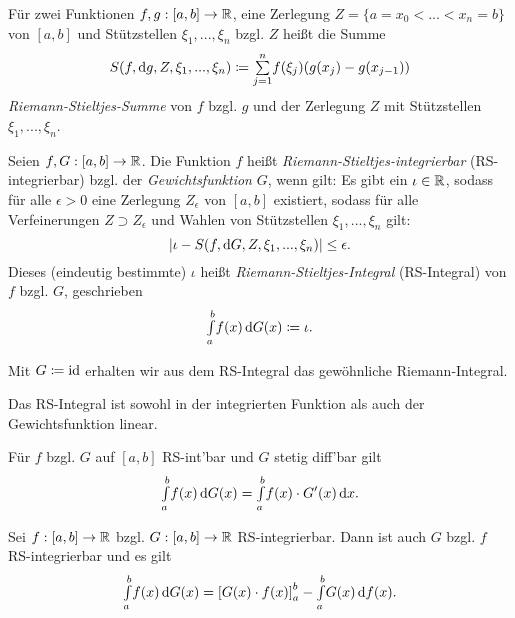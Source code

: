 \documentclass{cheat-sheet}
\begin{document}
\begin{defn}
  Für zwei Funktionen $f, g : [a, b] \to \mathbb{R}$, eine Zerlegung $Z = \{ a = x_0 < ... < x_n = b \}$ von $[a, b]$ und Stützstellen $\xi_1, ..., \xi_n$ bzgl. $Z$ heißt die Summe
  \[ S(f, \d g, Z, \xi_1, ..., \xi_n) \coloneqq \sum_{j=1}^{n}\!f(\xi_j)(g(x_j) - g(x_{j{-}1})) \]
  \emph{Riemann-Stieltjes-Summe} von $f$ bzgl. $g$ und der Zerlegung $Z$ mit Stützstellen $\xi_1, ..., \xi_n$.
\end{defn}

\begin{defn}
  Seien $f, G : \left[ a, b \right] \to \mathbb{R}$. Die Funktion $f$ heißt \emph{Riemann-Stieltjes-integrierbar} (RS-integrierbar) bzgl. der \emph{Gewichtsfunktion} $G$, wenn gilt: Es gibt ein $\iota \in \mathbb{R}$, sodass für alle $\epsilon > 0$ eine Zerlegung $Z_{\epsilon}$ von $\left[ a, b \right]$ existiert, sodass für alle Verfeinerungen $Z \supset Z_{\epsilon}$ und Wahlen von Stützstellen $\xi_1, ..., \xi_n$ gilt:
  \[ \lvert\iota - S(f, \mathrm{d} G, Z, \xi_1, ..., \xi_n)\rvert \le \epsilon. \]
  Dieses (eindeutig bestimmte) $\iota$ heißt \emph{Riemann-Stieltjes-Integral} (RS-Integral) von $f$ bzgl. $G$, geschrieben
  \[ {\textstyle \int\limits_{a}^{b}} f(x) \,\mathrm{d} G(x) \coloneqq \iota. \]
\end{defn}

\begin{bem}
  Mit $G \coloneqq \mathrm{id}$ erhalten wir aus dem RS-Integral das gewöhnliche Riemann-Integral.
\end{bem}

\begin{satz}
  Das RS-Integral ist sowohl in der integrierten Funktion als auch der Gewichtsfunktion linear.
\end{satz}

\begin{satz}
  Für $f$ bzgl. $G$ auf $\left[ a, b \right]$ RS-int'bar und $G$ stetig diff'bar gilt
  \[ {\textstyle \int\limits_{a}^{b}} f(x) \,\mathrm{d} G(x) = {\textstyle \int\limits_{a}^{b}} f(x) \cdot G'(x) \,\mathrm{d} x. \]
\end{satz}


\begin{satz} %
  Sei $f : \left[ a, b \right] \to \mathbb{R}$ bzgl. $G : \left[ a, b \right] \to \mathbb{R}$ RS-integrierbar. Dann ist auch $G$ bzgl. $f$ RS-integrierbar und es gilt
  \[ {\textstyle \int\limits_{a}^{b}} f(x) \,\mathrm{d} G(x) = \left[ G(x) \cdot f(x) \right]_a^b - {\textstyle \int\limits_{a}^{b}} G(x) \,\mathrm{d} f(x). \]
\end{satz}
\end{document}
